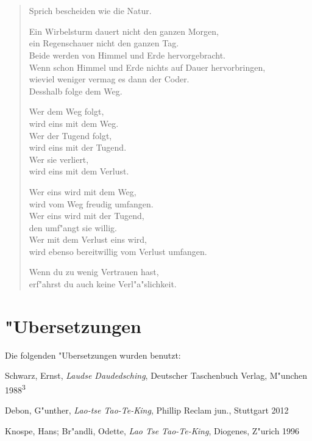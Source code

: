 \documentclass[a4paper,10pt,openany]{book}
\begin{document}
\chapter{}
\begin{verse}
    Sprich bescheiden wie die Natur.

    Ein Wirbelsturm dauert nicht den ganzen Morgen,\\
    ein Regenschauer nicht den ganzen Tag.\\
    Beide werden von Himmel und Erde hervorgebracht.\\
    Wenn schon Himmel und Erde nichts auf Dauer hervorbringen,\\
    wieviel weniger vermag es dann der Coder.\\
    Desshalb folge dem Weg.

    Wer dem Weg folgt,\\
    wird eins mit dem Weg.\\
    Wer der Tugend folgt,\\
    wird eins mit der Tugend.\\
    Wer sie verliert,\\
    wird eins mit dem Verlust.

    Wer eins wird mit dem Weg,\\
    wird vom Weg freudig umfangen.\\
    Wer eins wird mit der Tugend,\\
    den umf"angt sie willig.\\
    Wer mit dem Verlust eins wird,\\
    wird ebenso bereitwillig vom Verlust umfangen.

    Wenn du zu wenig Vertrauen hast,\\
    erf"ahrst du auch keine Verl"a"slichkeit.
\end{verse}



\appendix
\chapter{"Ubersetzungen}

Die folgenden "Ubersetzungen wurden benutzt:

\begin{description}
\item Schwarz, Ernst, \textit{Laudse Daudedsching}, Deutscher Taschenbuch Verlag, M"unchen 1988\textsuperscript{3}
\item Debon, G"unther, \textit{Lao-tse Tao-Te-King}, Phillip Reclam jun., Stuttgart 2012
\item Knospe, Hans; Br"andli, Odette, \textit{Lao Tse Tao-Te-King}, Diogenes, Z"urich 1996
\end{description}
\end{document}
